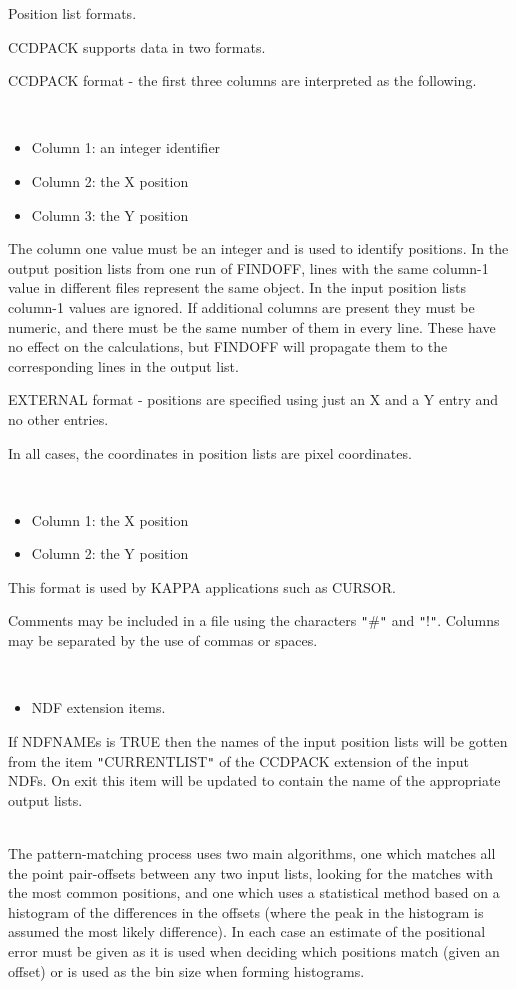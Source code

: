 \documentclass[twoside,11pt]{article}
\newcommand{\xref}[3]{#1}
\renewcommand{\_}{\texttt{\symbol{95}}}
\newcommand{\qt}[1]{{\tt "}#1{\tt "}}
\newcommand{\routine}[1]{{\sc #1}}
\newcommand{\sstdiytopic}[2]{\item[#1:] \mbox{} \\[1.3ex] #2}
\newcommand{\sstitemlist}[1]{
  \mbox{} \\
  \vspace{-3.5ex}
  \begin{itemize}
     #1
  \end{itemize}
}
\newcommand{\sstitem}{\item}
\newcommand{\sstdiytopic}[2]{\item[{#1:}] #2 }
\newcommand{\sstitemlist}[1]{
      \begin{itemize}
         #1
      \end{itemize}
      \\
   }
\newcommand{\sstitem}{\item}
\begin{document}
{{{         \sstitem
         Position list formats.

      }
        CCDPACK supports data in two formats.

        CCDPACK format - the first three columns are interpreted as the
        following.

      \sstitemlist{

         \sstitem
              Column 1: an integer identifier

         \sstitem
              Column 2: the X position

         \sstitem
              Column 3: the Y position

      }
        The column one value must be an integer and is used to identify
        positions.  In the output position lists from one run of \routine{FINDOFF},
        lines with the same column-1 value in different files represent
        the same object.  In the input position lists column-1 values
        are ignored.  If additional columns are present they must be
        numeric, and there must be the same number of them in every 
        line.  These have no effect on the calculations, but \routine{FINDOFF}
        will propagate them to the corresponding lines in the output
        list.

        EXTERNAL format - positions are specified using just an X
        and a Y entry and no other entries.

        In all cases, the coordinates in position lists are pixel
        coordinates.

      \sstitemlist{

         \sstitem
              Column 1: the X position

         \sstitem
              Column 2: the Y position

      }
        This format is used by KAPPA applications such as
        \xref{CURSOR}{sun95}{CURSOR}.

        Comments may be included in a file using the characters \qt{\#} and
        \qt{!}. Columns may be separated by the use of commas or spaces.

      \sstitemlist{

         \sstitem
         NDF extension items.

      }
        If NDFNAMEs is TRUE then the names of the input position lists
        will be gotten from the item \qt{CURRENT\_LIST} of the CCDPACK
        extension of the input NDFs. On exit this item will be updated
        to contain the name of the appropriate output lists.
   }
   \sstdiytopic{
      Notes on Algorithms
   } {
      The pattern-matching process uses two main algorithms, one which
      matches all the point pair-offsets between any two input lists,
      looking for the matches with the most common positions, and one
      which uses a statistical method based on a histogram of the
      differences in the offsets (where the peak in the histogram is
      assumed the most likely difference). In each case an estimate of
      the positional error must be given as it is used when deciding
      which positions match (given an offset) or is used as the bin
      size when forming histograms.

}}
\end{document}
